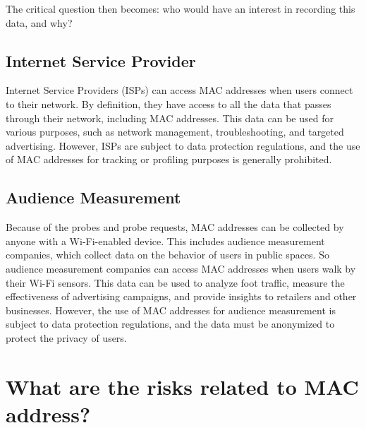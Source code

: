 \documentclass[aps,prb,twocolumn,superscriptaddress,floatfix,longbibliography,nofootinbib]{revtex4-2}
\begin{document}
  The critical question then becomes: who would have an interest in recording this data, and why? 

  \subsection{\label{subsec:ISP}Internet Service Provider}
  Internet Service Providers (ISPs) can access MAC addresses when users connect to their network.
  By definition, they have access to all the data that passes through their network, including MAC addresses.
  This data can be used for various purposes, such as network management, troubleshooting, 
  and targeted advertising. However, ISPs are subject to data protection regulations,
  and the use of MAC addresses for tracking or profiling purposes is generally prohibited.

  \subsection{\label{subsec:Audience}Audience Measurement}
  Because of the probes and probe requests, MAC addresses can be collected by anyone with a Wi-Fi-enabled device.
  This includes audience measurement companies, which collect data on the behavior of users in public spaces.
  So audience measurement companies can access MAC addresses when users walk by their Wi-Fi sensors.
  This data can be used to analyze foot traffic, measure the effectiveness of advertising campaigns,
  and provide insights to retailers and other businesses. However, the use of MAC addresses for audience measurement
  is subject to data protection regulations, and the data must be anonymized to protect the privacy of users.


\section{\label{sec:Risks}What are the risks related to MAC address?}
\end{document}
